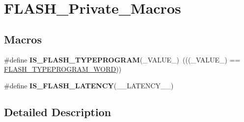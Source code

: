 \hypertarget{group___f_l_a_s_h___private___macros}{\section{F\-L\-A\-S\-H\-\_\-\-Private\-\_\-\-Macros}
\label{group___f_l_a_s_h___private___macros}
}
\subsection*{Macros}
\begin{DoxyCompactItemize}
\item 
\hypertarget{group___f_l_a_s_h___private___macros_ga36076c94de8f92d8de2239903c428b01}{\#define {\bfseries I\-S\-\_\-\-F\-L\-A\-S\-H\-\_\-\-T\-Y\-P\-E\-P\-R\-O\-G\-R\-A\-M}(\-\_\-\-V\-A\-L\-U\-E\-\_\-)~(((\-\_\-\-V\-A\-L\-U\-E\-\_\-) == \hyperlink{group___f_l_a_s_h___type___program_gadd25c6821539030ba6711e7c0d586c3e}{F\-L\-A\-S\-H\-\_\-\-T\-Y\-P\-E\-P\-R\-O\-G\-R\-A\-M\-\_\-\-W\-O\-R\-D}))}\label{group___f_l_a_s_h___private___macros_ga36076c94de8f92d8de2239903c428b01}

\item 
\#define {\bfseries I\-S\-\_\-\-F\-L\-A\-S\-H\-\_\-\-L\-A\-T\-E\-N\-C\-Y}(\-\_\-\-\_\-\-L\-A\-T\-E\-N\-C\-Y\-\_\-\-\_\-)
\end{DoxyCompactItemize}


\subsection{Detailed Description}


